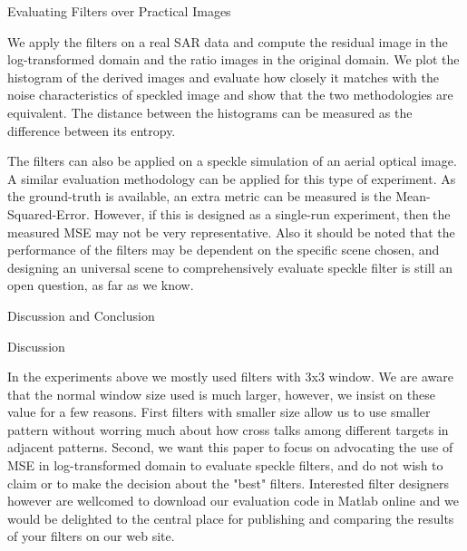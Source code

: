 Evaluating Filters over Practical Images

We apply the filters on a real SAR data and compute the residual image in the log-transformed domain and the ratio images in the original domain.
We plot the histogram of the derived images and evaluate how closely it matches with the noise characteristics of speckled image and show that the two methodologies are equivalent.
The distance between the histograms can be measured as the difference between its entropy.

The filters can also be applied on a speckle simulation of an aerial optical image. 
A similar evaluation methodology can be applied for this type of experiment.
As the ground-truth is available, an extra metric can be measured is the Mean-Squared-Error.
However, if this is designed as a single-run experiment, then the measured MSE may not be very representative. 
Also it should be noted that the performance of the filters may be dependent on the specific scene chosen, and designing an universal scene to comprehensively evaluate speckle filter is still an open question, as far as we know.

Discussion and Conclusion

Discussion

In the experiments above we mostly used filters with 3x3 window.
We are aware that the normal window size used is much larger, however, we insist on these value for a few reasons.
First filters with smaller size allow us to use smaller pattern without worring much about how cross talks among different targets in adjacent patterns.
Second, we want this paper to focus on advocating the use of MSE in log-transformed domain to evaluate speckle filters, and do not wish to claim or to make the decision about the "best" filters.
Interested filter designers however are wellcomed to download our evaluation code in Matlab online and we would be delighted to the central place for publishing and comparing the results of your filters on our web site.

